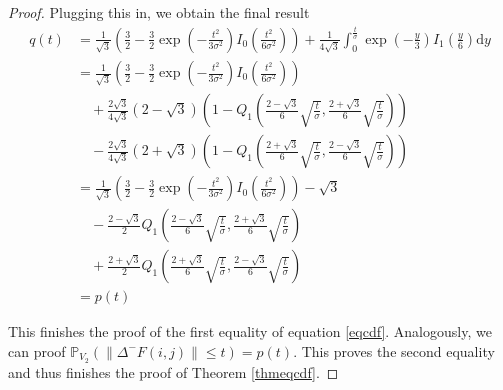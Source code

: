 \documentclass[a4paper,12pt]{article}
\newcommand{\norm}[1]{\lVert#1\rVert}
\theoremstyle{plain}
\theoremstyle{definition}
\begin{document}
\begin{proof}
	Plugging this in, we obtain the final result
	\begin{align*}
		q(t) &= \frac{1}{\sqrt{3}} \left( \frac{3}{2} - \frac{3}{2} \exp \left( - \frac{t^2}{3 \sigma^2} \right) I_0 \left( \frac{t^2}{6 \sigma^2} \right) \right) + \frac{1}{4 \sqrt{3}} \int_0^\frac{t}{\sigma} \exp \left( - \frac{y}{3} \right) I_1 \left( \frac{y}{6} \right) \mathrm{d}y \\
		&= \frac{1}{\sqrt{3}} \left( \frac{3}{2} - \frac{3}{2} \exp \left( - \frac{t^2}{3 \sigma^2} \right) I_0 \left( \frac{t^2}{6 \sigma^2} \right) \right) \\
		&\quad + \frac{2 \sqrt{3}}{4 \sqrt{3}} (2 - \sqrt{3}) \left( 1 - Q_1 \left( \frac{2 - \sqrt{3}}{6} \sqrt{\frac{t}{\sigma}}, \frac{2 + \sqrt{3}}{6} \sqrt{\frac{t}{\sigma}} \right) \right) \\
		&\quad - \frac{2 \sqrt{3}}{4 \sqrt{3}} (2 + \sqrt{3}) \left( 1 - Q_1 \left( \frac{2 + \sqrt{3}}{6} \sqrt{\frac{t}{\sigma}}, \frac{2 - \sqrt{3}}{6} \sqrt{\frac{t}{\sigma}} \right) \right) \\
		&= \frac{1}{\sqrt{3}} \left( \frac{3}{2} - \frac{3}{2} \exp \left( - \frac{t^2}{3 \sigma^2} \right) I_0 \left( \frac{t^2}{6 \sigma^2} \right) \right) - \sqrt{3} \\
		&\quad - \frac{2 - \sqrt{3}}{2} Q_1 \left( \frac{2 - \sqrt{3}}{6} \sqrt{\frac{t}{\sigma}}, \frac{2 + \sqrt{3}}{6} \sqrt{\frac{t}{\sigma}} \right) \\
		&\quad + \frac{2 + \sqrt{3}}{2} Q_1 \left( \frac{2 + \sqrt{3}}{6} \sqrt{\frac{t}{\sigma}}, \frac{2 - \sqrt{3}}{6} \sqrt{\frac{t}{\sigma}} \right) \\
		&= p(t)
	\end{align*}
	
	This finishes the proof of the first equality of equation \eqref{eqcdf}. Analogously, we can proof $\mathbb{P}_{V_2}( \norm{\Delta^- F(i, j)} \leq t ) = p(t)$. This proves the second equality and thus finishes the proof of Theorem \ref{thmeqcdf}.
\end{proof}
\end{document}
